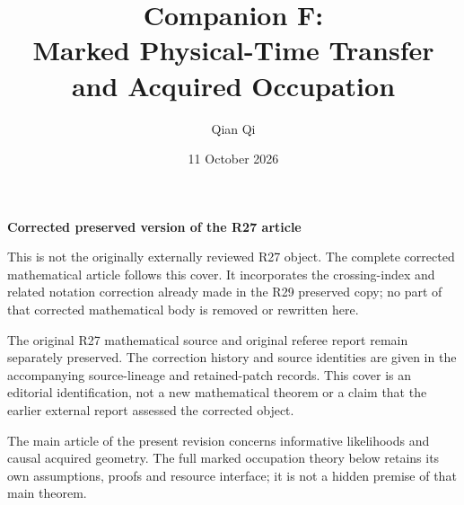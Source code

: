 \documentclass[11pt]{amsart}
\title{Companion F:\\Marked Physical-Time Transfer and Acquired Occupation}
\author{Qian Qi}\date{11 October 2026}
\begin{document}
\maketitle
\begin{center}\large\bfseries Corrected preserved version of the R27 article\end{center}
\medskip
\noindent This is not the originally externally reviewed R27 object. The complete corrected mathematical article follows this cover. It incorporates the crossing-index and related notation correction already made in the R29 preserved copy; no part of that corrected mathematical body is removed or rewritten here.

\medskip
The original R27 mathematical source and original referee report remain separately preserved. The correction history and source identities are given in the accompanying source-lineage and retained-patch records. This cover is an editorial identification, not a new mathematical theorem or a claim that the earlier external report assessed the corrected object.

\medskip
The main article of the present revision concerns informative likelihoods and causal acquired geometry. The full marked occupation theory below retains its own assumptions, proofs and resource interface; it is not a hidden premise of that main theorem.
\end{document}
